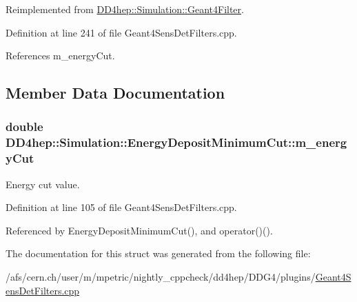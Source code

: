 Reimplemented from \hyperlink{class_d_d4hep_1_1_simulation_1_1_geant4_filter_afff6fafea1b7c0c7d61834ae0a51a23f}{DD4hep::Simulation::Geant4Filter}.

Definition at line 241 of file Geant4SensDetFilters.cpp.

References m\_\-energyCut.

\subsection{Member Data Documentation}
\hypertarget{struct_d_d4hep_1_1_simulation_1_1_energy_deposit_minimum_cut_a465b72d5d4e13d7f3555cfdfc1947697}{
\subsubsection[{m\_\-energyCut}]{\setlength{\rightskip}{0pt plus 5cm}double {\bf DD4hep::Simulation::EnergyDepositMinimumCut::m\_\-energyCut}}}
\label{struct_d_d4hep_1_1_simulation_1_1_energy_deposit_minimum_cut_a465b72d5d4e13d7f3555cfdfc1947697}


Energy cut value. 

Definition at line 105 of file Geant4SensDetFilters.cpp.

Referenced by EnergyDepositMinimumCut(), and operator()().

The documentation for this struct was generated from the following file:\begin{DoxyCompactItemize}
\item 
/afs/cern.ch/user/m/mpetric/nightly\_\-cppcheck/dd4hep/DDG4/plugins/\hyperlink{_geant4_sens_det_filters_8cpp}{Geant4SensDetFilters.cpp}\end{DoxyCompactItemize}
